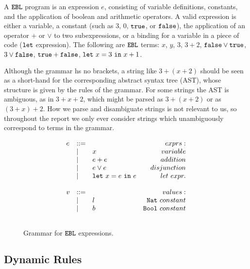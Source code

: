 A $\mathtt{EBL}$ program is an expression $e$, consisting of variable definitions, constants, and the application of boolean and arithmetic operators. A valid expression is either a variable, a constant (such as $3$, $0$, $\mathtt{true}$, or $\mathtt{false}$), the application of an operator $+$ or $\lor$ to two subexpressions, or a binding for a variable in a piece of code ($\mathtt{let}$ expression). The following are $\mathtt{EBL}$ terms: $x$, $y$, $3$, $3+2$, $\mathtt{false} \lor \mathtt{true}$, $3 \lor \mathtt{false}$, $\mathtt{true} + \mathtt{false}$, $\mathtt{let}~ x = 3~\mathtt{in}~ x+1$.

Although the grammar hs no brackets, a string like $3 + (x + 2)$ should be seen as a short-hand for the corresponding abstract syntax tree (AST), whose structure is given by the rules of the grammar. For some strings the AST is ambiguous, as in $3 + x + 2$, which might be parsed as $3 + (x + 2)$ or as $(3 + x) + 2$. How we parse and disambiguate strings is not relevant to us, so throughout the report we only ever consider strings which unambiguously correspond to terms in the grammar.\\

\begin{figure}[h]

\[
\begin{array}{c}

\begin{array}{lllr}

e & ::= & ~ & exprs: \\
	& | & x & variable \\
	& | & e + e & addition \\
	& | & e \lor e & disjunction \\
	& | & \mathtt{let}~ x = e~\mathtt{in}~ e & let~expr. \\
	&&\\
	
v & ::= & ~ & values: \\
	& | & l & \mathtt{Nat}~constant \\
	& | & b & \mathtt{Bool}~constant \\
	&&\\

\end{array}

\end{array}
\]

\vspace{-12pt}
\caption{Grammar for $\mathtt{EBL}$ expressions.}
\label{fig:ebl_grammar}
\end{figure}


\subsection{Dynamic Rules}

